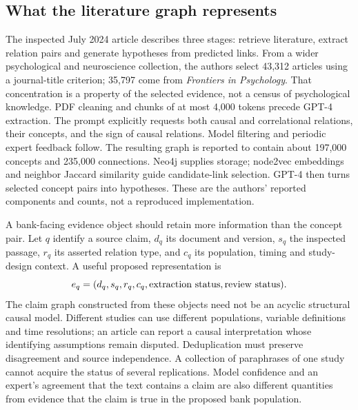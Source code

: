 \subsection{What the literature graph represents}
\label{exec20:hypothesis-claims}
The inspected July 2024 article describes three stages: retrieve literature, extract relation pairs and generate hypotheses from predicted links. From a wider psychological and neuroscience collection, the authors select 43,312 articles using a journal-title criterion; 35,797 come from \emph{Frontiers in Psychology}. That concentration is a property of the selected evidence, not a census of psychological knowledge. PDF cleaning and chunks of at most 4,000 tokens precede GPT-4 extraction. The prompt explicitly requests both causal and correlational relations, their concepts, and the sign of causal relations. Model filtering and periodic expert feedback follow. The resulting graph is reported to contain about 197,000 concepts and 235,000 connections. Neo4j supplies storage; node2vec embeddings and neighbor Jaccard similarity guide candidate-link selection. GPT-4 then turns selected concept pairs into hypotheses. These are the authors' reported components and counts, not a reproduced implementation.~\citep{exec20_hypothesis_generation}

A bank-facing evidence object should retain more information than the concept pair. Let $q$ identify a source claim, $d_q$ its document and version, $s_q$ the inspected passage, $r_q$ its asserted relation type, and $c_q$ its population, timing and study-design context. A useful proposed representation is
\begin{equation}
  e_q=(d_q,s_q,r_q,c_q,\hbox{extraction status},\hbox{review status}).
  \label{exec20:hypothesis-evidence}
\end{equation}
The claim graph constructed from these objects need not be an acyclic structural causal model. Different studies can use different populations, variable definitions and time resolutions; an article can report a causal interpretation whose identifying assumptions remain disputed. Deduplication must preserve disagreement and source independence. A collection of paraphrases of one study cannot acquire the status of several replications. Model confidence and an expert's agreement that the text contains a claim are also different quantities from evidence that the claim is true in the proposed bank population.

